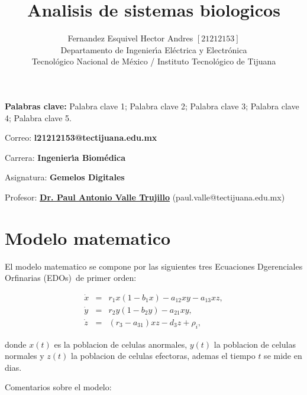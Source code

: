 \documentclass[letterpaper,11pt]{article}
\begin{document}
\title{Analisis de sistemas biologicos}
\author{Fernandez Esquivel Hector Andres $\left[ 21212153\right] $ \\
Departamento de Ingenier\'{\i}a El\'{e}ctrica y Electr\'{o}nica\\
Tecnol\'{o}gico Nacional de M\'{e}xico / Instituto Tecnol\'{o}gico de Tijuana%
}
\maketitle

\noindent \textbf{Palabras clave: }Palabra clave 1; Palabra clave 2; Palabra
clave 3; Palabra clave 4; Palabra clave 5.

\noindent Correo: \textbf{l21212153@tectijuana.edu.mx}

\noindent \noindent Carrera: \textbf{Ingenier\'{\i}a Biom\'{e}dica }

\noindent Asignatura: \textbf{Gemelos Digitales}

\noindent Profesor: \href{https://biomath.xyz/}{\textbf{Dr. Paul Antonio
Valle Trujillo}} (paul.valle@tectijuana.edu.mx)

\section{Modelo matematico}

\bigskip El modelo matematico se compone por las siguientes tres Ecuaciones
Dgerenciales Orfinarias (EDOs)\ de primer orden:

\begin{eqnarray}
\dot{x} &=&r_{1}x(1-b_{1}x)-a_{12}xy-a_{13}xz,  \label{dx} \\
\dot{y} &=&r_{2}y(1-b_{2}y)-a_{21}xy,  \label{dy} \\
\dot{z} &=&(r_{3}-a_{31})xz-d_{3}z+\rho _{i},  \label{dz}
\end{eqnarray}

donde $x(t)$ es la poblacion de celulas anormales, $y(t)$ la poblacion de
celulas normales y $z(t)$ la poblacion de celulas efectoras, ademas el
tiempo $t$ se mide en dias.

Comentarios sobre el modelo:
\end{document}
